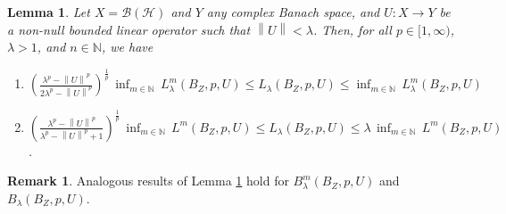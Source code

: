 \documentclass[a4paper,11pt, reqno]{amsart}
\newtheorem{lem}{Lemma}[section]
\theoremstyle{definition}
\newtheorem{rem}{Remark}[section]
\newenvironment{customthm}[1]
{\renewcommand\theinnercustomthm{#1}\innercustomthm}
{\endinnercustomthm}
\newcommand{\norm}[1]{\left\lVert#1\right\rVert}
\newcommand{\comment}[1]{}
\begin{document}
\begin{lem} \label{lem-3.3}
	Let $X=\mathcal{B}(\mathcal{H})$ and $Y$ any complex Banach space, and $U: X \rightarrow Y$ be a non-null bounded linear operator such that $\norm{U}< \lambda$. Then, for all $p\in[1,\infty)$, $\lambda>1$, and $n \in \mathbb{N}$, we have
	\begin{enumerate}
		\item $\left(\frac{\lambda^p - \norm{U}^p}{2\lambda^p - \norm{U}^p}\right)^{\frac{1}{p}}\, \inf_{m\in \mathbb{N}}\, L^{m}_{\lambda}(B_{Z}, p,U) \leq L_{\lambda}(B_{Z}, p,U) \leq \inf_{m\in \mathbb{N}}\, L^{m}_{\lambda}(B_{Z}, p,U)$
		
		\item $\left(\frac{\lambda^p - \norm{U}^p}{\lambda^p - \norm{U}^p +1}\right)^{\frac{1}{p}}\, \inf_{m\in \mathbb{N}}\, L^{m}(B_{Z}, p,U) \leq L_{\lambda}(B_{Z}, p,U) \leq \lambda \, \inf_{m\in \mathbb{N}}\, L^{m}(B_{Z}, p,U)$.
	\end{enumerate}
\end{lem}
\begin{rem} \label{rem-4.1}
	Analogous results of Lemma \ref{lem-3.3} hold for $B^m_{\lambda}(B_{Z}, p,U)$ and $B_{\lambda}(B_{Z}, p,U)$.
\end{rem}
\comment{\noindent The following lemma compares the Bohr radius constants for two complete Reinhardt domains. Its proof is similar to that of \cite[Lemma 2.5]{defant-2004} and is therefore omitted. Before stating the result, we introduce the following standard notation. For bounded Reinhardt domains $\Omega_{1}, \Omega_{2}\subset \mathbb{C}^n$, let $S(\Omega_1, \Omega_{2}):= \inf \left\{s>0 : \Omega_{1} \subset s \, \Omega_{2}\right\}$. Recall that if $Z$ and $W$ are Banach sequence spaces then $S(B_{Z},B_{W})=\norm{Id:Z \rightarrow W}$.
	
	\noindent As an immediate application, we observe that the Bohr radius $R_{\lambda}(\mathbb{D}^n, p,U)$ serves as a universal lower bound for the Bohr radius $R_{\lambda}(\Omega, p,U)$ of every complete Reinhardt domain.
	\begin{lem} \label{lem-3.4}
		For any complete Reinhardt domain $\Omega$, we have 
		$
		R_{\lambda}(\Omega, p,U) \geq R_{\lambda}(\mathbb{D}^n, p,U).
		$
	\end{lem}
	We use the following remarkable result by Maurey and Pisier to prove the desired upper bound in the case of infinte dimensional complex Banach space. 
\begin{customthm}{A} \cite[Theorem 14.5]{diestel-abs-summing-1995} \label{thm-A}
	Given any infinite dimensional complex Banach space $X$, there exist $x_{1}, \ldots , x_{n} \in X$ for each $n \in \mathbb{N}$ such that $\norm{z}_{\infty}/2 \leq \norm{\sum_{j=1}^{n} x_{j}z_{j}} \leq \norm{z}_{Cot(X)}$  for every choice of $z=(z_{1}, \ldots,z_{n}) \in \mathbb{C}^n$. Clearly, setting $z=e_{j}$, gives $\norm{x_{j}}\geq 1/2$, where $e_{j}$ is the $j$-th canonical basis vector of $\mathbb{C}^n$.
\end{customthm}}
\end{document}
